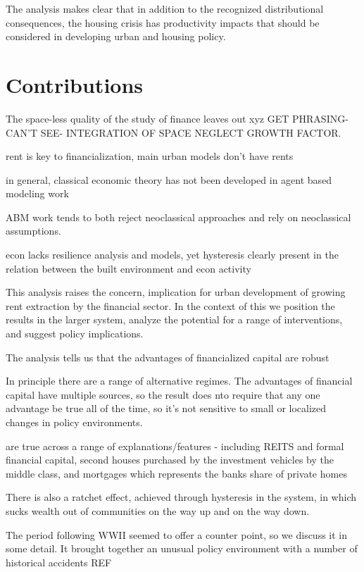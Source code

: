 The analysis makes clear that in addition to the recognized distributional consequences, the housing crisis has productivity impacts that should be considered in developing urban and housing policy. 


\section{Contributions}

The space-less quality of the study of finance leaves out xyz GET PHRASING- CAN'T SEE- INTEGRATION OF SPACE NEGLECT GROWTH FACTOR. 

rent is key to financialization, main urban models don't  have rents

in general, classical economic theory has not been developed in agent based modeling work

ABM work tends to both reject neoclassical approaches and rely on neoclassical assumptions.

econ lacks resilience analysis and models, yet hysteresis clearly present in the relation between the built environment and econ activity

This analysis raises the concern, implication for urban development of growing rent extraction by the financial sector.   In the context of this we position the results in the larger system, analyze the potential for a range of interventions, and suggest policy implications.



The analysis tells us that the advantages of financialized capital are robust 

In principle there are a range of alternative regimes.
The advantages of financial capital have multiple sources, so the result does nto require that any one advantage be true all of the time, so it's not sensitive to small or localized changes in policy environments.

are true across a range of explanations/features - including REITS and formal financial capital, second houses purchased by the investment vehicles by the middle class, and mortgages which represents the banks share of private homes

There is also a ratchet effect, achieved through hysteresis in the system, in which sucks wealth out of communities on the way up and on the way down.

The period following WWII seemed to offer a counter point, so we discuss it in some detail. It brought together an unusual policy environment with a number of historical accidents REF




